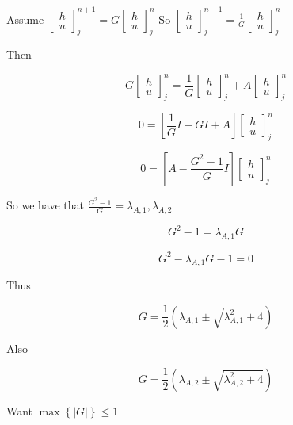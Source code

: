 \documentclass[12pt]{article}
\begin{document}
Assume $\left[\begin{array}{c}
h \\
u
\end{array} \right]^{n+1}_j = G \left[\begin{array}{c}
h \\
u
\end{array} \right]^{n}_j$ So $\left[\begin{array}{c}
h \\
u
\end{array} \right]^{n-1}_j = \frac{1}{G} \left[\begin{array}{c}
h \\
u
\end{array} \right]^{n}_j$

Then 


\[
G\left[\begin{array}{c}
h \\
u
\end{array} \right]^{n}_j = \frac{1}{G}\left[\begin{array}{c}
h \\
u
\end{array} \right]^{n}_j +A  \left[\begin{array}{c}
h \\
u
\end{array} \right]^{n}_j 
\]


\[
0 =\left[\frac{1}{G}I - G I + A\right]  \left[\begin{array}{c}
h \\
u
\end{array} \right]^{n}_j 
\]

\[
0 =\left[A  - \frac{G^2-1}{G}I\right]  \left[\begin{array}{c}
h \\
u
\end{array} \right]^{n}_j 
\]

So we have that $\frac{G^2-1}{G} = \lambda_{A,1} , \lambda_{A,2}  $

\[G^2-1 = \lambda_{A,1}G\] 

\[G^2 - \lambda_{A,1}G -1 = 0\] 

Thus

\[G =\frac{1}{2}\left(\lambda_{A,1} \pm \sqrt{\lambda_{A,1}^2 + 4}\right)  \]

Also 

\[G =\frac{1}{2}\left(\lambda_{A,2} \pm \sqrt{\lambda_{A,2}^2 + 4}\right)  \]

Want $\max\left\lbrace|G|\right\rbrace \le 1$
\end{document}
